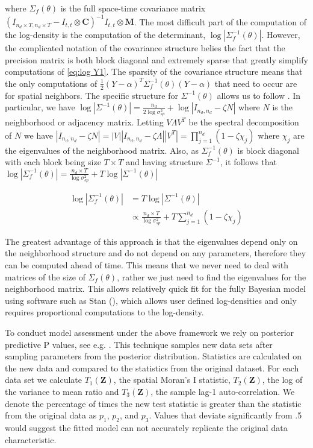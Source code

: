 \documentclass[11pt]{isuthesis}
\begin{document}
where $\Sigma_f(\theta)$ is the full space-time covariance matrix $\left(I_{n_d \times T,n_d \times T}-I_{t,t}\otimes \boldsymbol{C}\right)^{-1}I_{t,t}\otimes \boldsymbol{M}$.  The most difficult part of the computation of the log-density is the computation of the determinant, $\log | \Sigma_f^{-1}(\theta)|$.  However, the complicated notation of the covariance structure belies the fact that the precision matrix is both block diagonal and extremely sparse that greatly simplify computations of \eqref{eq:log Y1}.  The sparsity of the covariance structure means that the only computations of $\frac{1}{2}(Y-\alpha)^T\Sigma_f^{-1}(\theta)(Y-\alpha)$ that need to occur are for spatial neighbors.  The specific structure for $\Sigma^{-1}(\theta)$ allows us to follow \cite{jin2005generalized}.  In particular, we have $\log|\Sigma^{-1}(\theta)|=\frac{n_d}{2\log\sigma_{sp}^2}+\log|I_{n_d,n_d}-\zeta N|$ where $N$ is the neighborhood or adjacency matrix.  Letting $V \Lambda V^T$ be the spectral decomposition of $N$ we have $|I_{n_d,n_d}-\zeta N|=|V| |I_{n_d,n_d}-\zeta \Lambda| |V^T|=\prod_{j=1}^{n_d}\left(1-\zeta \chi_j\right)$ where $\chi_j$ are the eigenvalues of the neighborhood matrix.  Also, as $ \Sigma_f^{-1}(\theta)$ is block diagonal with each block being size $T \times T$ and having structure $\Sigma^{-1}$, it follows that $\log| \Sigma_f^{-1}(\theta)|=\frac{n_d \times T}{\log\sigma_{sp}^2}+T\log| \Sigma^{-1}(\theta)|$

\begin{align}
	\log | \Sigma_f^{-1}(\theta)|&  = T \log | \Sigma^{-1}(\theta)|\\
	& \propto \frac{n_d \times T}{\log\sigma_{sp}^2}+ T \sum_{j=1}^{n_d}(1-\zeta\chi_j) \label{eq:eig}
\end{align}

The greatest advantage of this approach is that the eigenvalues depend only on the neighborhood structure and do not depend on any parameters, therefore they can be computed ahead of time.  This means that we never need to deal with matrices of the size of  $\Sigma_f(\theta)$, rather we just need to find the eigenvalues for the neighborhood matrix.  This allows relatively quick fit for the fully Bayesian model using software such as Stan (\cite{carpenter2016stan}), which allows user defined log-densities and only requires proportional computations to the log-density. 

To conduct model assessment under the above framework we rely on posterior predictive P values, see e.g. \cite{gelman1996posterior}.  This technique samples new data sets after sampling parameters from the posterior distribution.  Statistics are calculated on the new data and compared to the statistics from the original dataset.  For each data set we calculate $T_1(\boldsymbol{Z})$, the spatial Moran's I statistic, $T_2(\boldsymbol{Z})$, the log of the variance to mean ratio and $T_3(\boldsymbol{Z})$, the sample lag-1 auto-correlation.  We denote the percentage of times the new test statistic is greater than the statistic from the original data as $p_1$, $p_2$, and $p_3$.  Values that deviate significantly from .5 would suggest the fitted model can not accurately replicate the original data characteristic.
\end{document}

